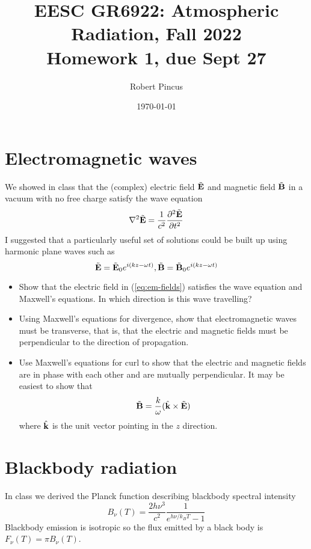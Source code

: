 \documentclass{article}
\title{EESC GR6922: Atmospheric Radiation, Fall 2022 \\ Homework 1, due Sept 27 }
\author{Robert Pincus}
\date{\today}
\begin{document}
\maketitle
\section{Electromagnetic waves}
We showed in class that the (complex) electric field $\tilde{\bf E}$ and magnetic field $\tilde{\bf B}$ in a vacuum with no free charge satisfy the wave equation
\begin{equation} \label{eq:wave-eq}
\nabla^2  \tilde{\bf E} = \frac{1}{c^2}\frac{\partial^2 \tilde{\bf E} }{\partial t^2}
\end{equation}
I suggested that a particularly useful set of solutions could be built up using harmonic plane waves such as
\begin{equation} \label{eq:em-fields} 
\tilde{\bf E} = \tilde{\bf E}_0 e^{i(k z - \omega t)}, \tilde{\bf B} = \tilde{\bf B}_0 e^{i(k z - \omega t)}
\end{equation} 

\begin{itemize} 
\item Show that the electric field in (\ref{eq:em-fields}) satisfies the wave equation and Maxwell's equations. In which direction is this wave travelling?
\item Using Maxwell’s equations for divergence, show that electromagnetic waves must be transverse, that is, that the electric and magnetic fields must be perpendicular to the direction of propagation.
\item Use Maxwell’s equations for curl to show that the electric and magnetic fields are in phase with each other and are mutually perpendicular. It may be easiest to show that
\begin{equation*}
\tilde{\bf B} =  \frac{k}{\omega} (\hat{\bf k} \times \tilde{\bf E})
\end{equation*}
where $\hat{\bf k}$ is the unit vector pointing in the $z$ direction. 
\end {itemize} 

\section{Blackbody radiation}

In class we derived the Planck function describing blackbody spectral intensity
\begin{equation}\label{eq:Planck-function}
 B_{\nu}(T) = \frac{2 h \nu^3}{c^2} \frac{1}{e^{h \nu/{k_B T}} - 1} 
\end{equation} 
Blackbody emission is isotropic so the flux emitted by a black body is $F_{\nu}(T) = \pi B_{\nu}(T)$.
\end{document}

